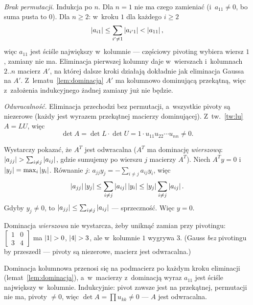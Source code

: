 \documentclass[11pt]{article}
\begin{document}
\emph{Brak permutacji.} Indukcja po $n$. Dla $n=1$ nie ma czego zamieniać
(i~$a_{11}\ne0$, bo suma pusta to $0$). Dla $n\ge2$: w~kroku $1$ dla każdego
$i\ge2$
\[
\left\lvert a_{i1} \right\rvert\le\sum_{i'\ne1}\left\lvert a_{i'1} \right\rvert<\left\lvert a_{11} \right\rvert,
\]
więc $a_{11}$ jest ściśle największy w~kolumnie --- częściowy pivoting
wybiera wiersz $1$, zamiany nie ma. Eliminacja pierwszej kolumny daje
w~wierszach i~kolumnach $2..n$ macierz $A'$, na której dalsze kroki
działają dokładnie jak eliminacja Gaussa na $A'$. Z~lematu~\ref{lem:dominacja}
$A'$ ma kolumnowo dominującą przekątną, więc z~założenia indukcyjnego
żadnej zamiany już nie będzie.

\emph{Odwracalność.} Eliminacja przechodzi bez permutacji, a~wszystkie
pivoty są niezerowe (każdy jest wyrazem przekątnej macierzy dominującej).
Z~tw.~\ref{tw:lu} $A=LU$, więc
\[
\det A=\det L\cdot\det U=1\cdot u_{11}u_{22}\cdots u_{nn}\ne0.
\]

\begin{uwaga}
Wystarczy pokazać, że $A^T$ jest odwracalna ($A^T$ ma dominację
\emph{wierszową}: $\left\lvert a_{jj} \right\rvert>\sum_{i\ne j}\left\lvert a_{ij} \right\rvert$, gdzie sumujemy
po wierszu $j$ macierzy $A^T$). Niech $A^Ty=0$ i~$\left\lvert y_j \right\rvert=\max_i\left\lvert y_i \right\rvert$.
Równanie $j$: $a_{jj}y_j=-\sum_{i\ne j}a_{ij}y_i$, więc
\[
\left\lvert a_{jj} \right\rvert\left\lvert y_j \right\rvert\le\sum_{i\ne j}\left\lvert a_{ij} \right\rvert\left\lvert y_i \right\rvert
\le\left\lvert y_j \right\rvert\sum_{i\ne j}\left\lvert a_{ij} \right\rvert.
\]
Gdyby $y_j\ne0$, to $\left\lvert a_{jj} \right\rvert\le\sum_{i\ne j}\left\lvert a_{ij} \right\rvert$ ---
sprzeczność. Więc $y=0$.
\end{uwaga}

\begin{uwaga}
Dominacja \emph{wierszowa} nie wystarcza, żeby uniknąć zamian przy
pivotingu: $\left[\begin{smallmatrix}1&0\\3&4\end{smallmatrix}\right]$ ma
$\left\lvert 1 \right\rvert>0$, $\left\lvert 4 \right\rvert>3$, ale w~kolumnie $1$ wygrywa $3$. (Gauss \emph{bez}
pivotingu by przeszedł --- pivoty są niezerowe, macierz jest odwracalna.)
\end{uwaga}

\begin{odpowiedz}
Dominacja kolumnowa przenosi się na podmacierz po każdym kroku eliminacji
(lemat~\ref{lem:dominacja}), a~w~macierzy z~dominacją wyraz $a_{11}$ jest
ściśle największy w~kolumnie. Indukcyjnie: pivot zawsze jest na przekątnej,
permutacji nie ma, pivoty $\ne0$, więc $\det A=\prod u_{kk}\ne0$ --- $A$ jest
odwracalna.
\end{odpowiedz}
\end{document}
